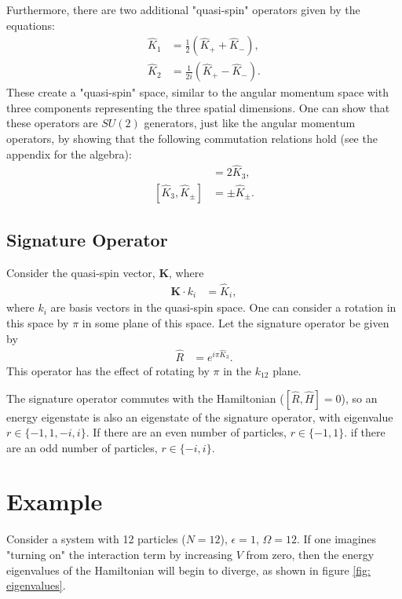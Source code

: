 \documentclass[
a4paper,
10pt,
twoside,
]{article}
\begin{document}
Furthermore, there are two additional "quasi-spin" operators given by the equations:
\begin{align}
	\hat{K}_1 &= \frac{1}{2}(\hat{K}_+ + \hat{K}_-),\\
	\hat{K}_2 &= \frac{1}{2i}(\hat{K}_+ - \hat{K}_-).
\end{align}
These create a "quasi-spin" space, similar to the angular momentum space with three components representing the three spatial dimensions.
One can show that these operators are $SU(2)$ generators, just like the angular momentum operators, by showing that the following commutation relations hold (see the appendix for the algebra):
\begin{align}
	[\hat{K}_+,\hat{K}_-] &= 2\hat{K}_3,\\
	[\hat{K}_3,\hat{K}_\pm] &= \pm\hat{K}_\pm.
\end{align}

\subsection{Signature Operator}\label{ssec: qs-sig}


Consider the quasi-spin vector, $\bm{K}$, where
\begin{align}
	\bm{K}\cdot k_i &= \hat{K}_i,
\end{align}
where $k_i$ are basis vectors in the quasi-spin space.
One can consider a rotation in this space by $\pi$ in some plane of this space.
Let the signature operator be given by
\begin{align}
	\hat{R} &= e^{i\pi\hat{K}_3}.
\end{align}
This operator has the effect of rotating by $\pi$ in the $k_{12}$ plane.

The signature operator commutes with the Hamiltonian ($[\hat{R},\hat{H}] = 0$), so an energy eigenstate is also an eigenstate of the signature operator, with eigenvalue $r \in \{-1,1,-i,i\}$.
If there are an even number of particles, $r\in\{-1,1\}$.
if there are an odd number of particles, $r\in\{-i,i\}$.


\section{Example}\label{sec: example}

Consider a system with 12 particles ($N=12$), $\epsilon = 1$, $\Omega = 12$.
If one imagines "turning on" the interaction term by increasing $V$ from zero, then the energy eigenvalues of the Hamiltonian will begin to diverge, as shown in figure \ref{fig: eigenvalues}.
\end{document}
